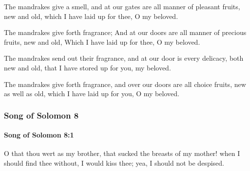 			The mandrakes give a smell, and at our gates are all manner of pleasant fruits, new and old, which I have laid up for thee, O my beloved.

			\begin{versebox}
					\item[BHS] 
					\item[LXX] 
					\item[ASV] The mandrakes give forth fragrance; And at our doors are all manner of precious fruits, new and old, Which I have laid up for thee, O my beloved.
					\item[NIV] The mandrakes send out their fragrance, and at our door is every delicacy, both new and old, that I have stored up for you, my beloved.
					\item[NRSV] The mandrakes give forth fragrance, and over our doors are all choice fruits, new as well as old, which I have laid up for you, O my beloved.
			\end{versebox}
	\subsubsection{Song of Solomon 8} %
		\label{SONGOFSOLOMON-8}

		\paragraph{Song of Solomon 8:1} %
			\label{SONGOFSOLOMON-8-1}

			O that thou wert as my brother, that sucked the breasts of my mother! when I should find thee without, I would kiss thee; yea, I should not be despised.

